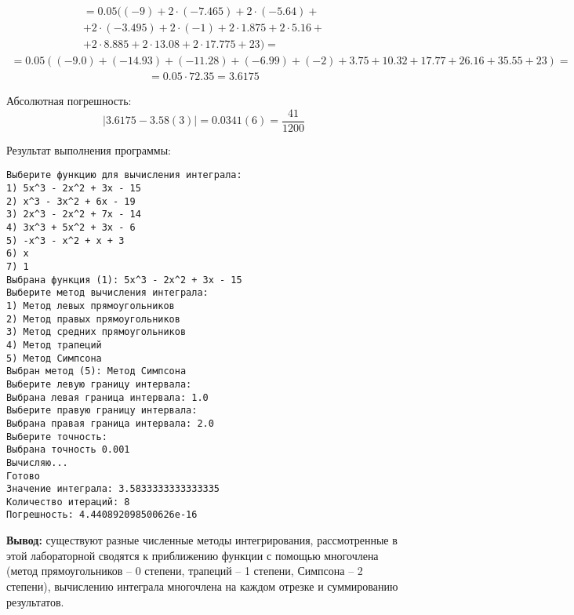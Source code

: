 \documentclass[10pt,a4paper]{article}
\begin{document}
    \begin{gather*}
        =0.05(
        (-9)+2\cdot (-7.465)+2\cdot (-5.64)+\\
        +2\cdot (-3.495)+2\cdot (-1)+2\cdot 1.875+2\cdot 5.16+\\
        +2\cdot 8.885+2\cdot 13.08+2\cdot 17.775+23)=
    \end{gather*}
    \begin{gather*}
        =0.05((-9.0)+(-14.93)+(-11.28)+(-6.99)+(-2)+3.75+10.32+17.77+26.16+35.55+23)=
    \end{gather*}
    \begin{gather*}
        =0.05\cdot 72.35=3.6175
    \end{gather*}

    Абсолютная погрешность:
    \[ |3.6175-3.58(3)|=0.0341(6)=\frac{41}{1200} \]

    Результат выполнения программы:
    \begin{verbatim}
Выберите функцию для вычисления интеграла:
1) 5x^3 - 2x^2 + 3x - 15
2) x^3 - 3x^2 + 6x - 19
3) 2x^3 - 2x^2 + 7x - 14
4) 3x^3 + 5x^2 + 3x - 6
5) -x^3 - x^2 + x + 3
6) x
7) 1
Выбрана функция (1): 5x^3 - 2x^2 + 3x - 15
Выберите метод вычисления интеграла:
1) Метод левых прямоугольников
2) Метод правых прямоугольников
3) Метод средних прямоугольников
4) Метод трапеций
5) Метод Симпсона
Выбран метод (5): Метод Симпсона
Выберите левую границу интервала:
Выбрана левая граница интервала: 1.0
Выберите правую границу интервала:
Выбрана правая граница интервала: 2.0
Выберите точность:
Выбрана точность 0.001
Вычисляю...
Готово
Значение интеграла: 3.5833333333333335
Количество итераций: 8
Погрешность: 4.440892098500626e-16
    \end{verbatim}

    \textbf{Вывод:}
    существуют разные численные методы интегрирования,
    рассмотренные в этой лабораторной сводятся к приближению функции с помощью многочлена
    (метод прямоугольников -- 0 степени, трапеций -- 1 степени, Симпсона -- 2 степени),
    вычислению интеграла многочлена на каждом отрезке и суммированию результатов.
\end{document}
